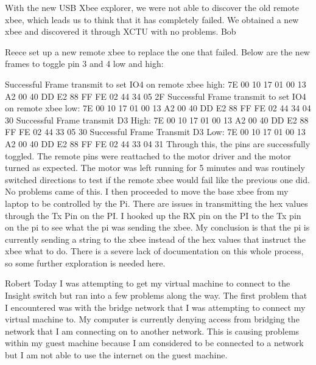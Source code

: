\documentclass[fontsize=11pt, %
                             paper=letter, %
                             twoside, %
                             captions=tableheading,
                             index=totoc,
                             hyperref]{labbook}
\begin{document}
With the new USB Xbee explorer, we were not able to discover the old remote xbee, which leads us to think that it has completely failed. We obtained a new xbee and discovered it through XCTU with no problems. Bob 


Reece set up a new remote xbee to replace the one that failed. Below are the new frames to toggle pin 3 and 4 low and high: 

\vspace{1.0cm}
\noindent
Successful Frame transmit to set IO4 on remote xbee high: 
\newline 7E 00 10 17 01 00 13 A2 00 40 DD E2 88 FF FE 02 44 34 05 2F
\newline 
\newline Successful Frame transmit to set IO4 on remote xbee low:
\newline 7E 00 10 17 01 00 13 A2 00 40 DD E2 88 FF FE 02 44 34 04 30
\newline 
\newline Successful Frame transmit D3 High: 
\newline 7E 00 10 17 01 00 13 A2 00 40 DD E2 88 FF FE 02 44 33 05 30
\newline Successful Frame Transmit D3 Low: 
\newline 7E 00 10 17 01 00 13 A2 00 40 DD E2 88 FF FE 02 44 33 04 31
\newline
\newline Through this, the pins are successfully toggled. The remote pins were reattached to the motor driver and the motor turned as expected. The motor was left running for 5 minutes and was routinely switched directions to test if the remote xbee would fail like the previous one did. No problems came of this. I then proceeded to move the base xbee from my laptop to be controlled by the Pi. There are issues in transmitting the hex values through the Tx Pin on the PI. I hooked up the RX pin on the PI to the Tx pin on the pi to see what the pi was sending the xbee. My conclusion is that the pi is currently sending a string to the xbee instead of the hex values that instruct the xbee what to do. There is a severe lack of documentation on this whole process, so some further exploration is needed here. 

Robert
\newline Today I was attempting to get my virtual machine to connect to the Insight switch but ran into a few problems along the way. The first problem that I encountered was with the bridge network that I was attempting to connect my virtual machine to. My computer is currently denying access from bridging the network that I am connecting on to another network. This is causing problems within my guest machine because I am considered to be connected to a network but I am not able to use the internet on the guest machine. 
\end{document}
